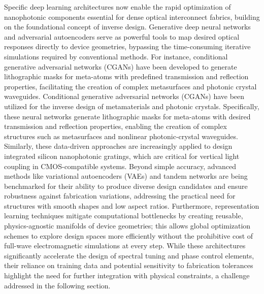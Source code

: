 \documentclass[11pt]{article}
\begin{document}
Specific deep learning architectures now enable the rapid optimization of nanophotonic components essential for dense optical interconnect fabrics, building on the foundational concept of inverse design. Generative deep neural networks and adversarial autoencoders serve as powerful tools to map desired optical responses directly to device geometries, bypassing the time-consuming iterative simulations required by conventional methods. For instance, conditional generative adversarial networks (CGANs) have been developed to generate lithographic masks for meta-atoms with predefined transmission and reflection properties, facilitating the creation of complex metasurfaces and photonic crystal waveguides. Conditional generative adversarial networks (CGANs) have been utilized for the inverse design of metamaterials and photonic crystals. Specifically, these neural networks generate lithographic masks for meta-atoms with desired transmission and reflection properties, enabling the creation of complex structures such as metasurfaces and nonlinear photonic-crystal waveguides. \citep{doi_10_1109_metamaterials62190_2024_10703328_b89eaef7} Similarly, these data-driven approaches are increasingly applied to design integrated silicon nanophotonic gratings, which are critical for vertical light coupling in CMOS-compatible systems. Beyond simple accuracy, advanced methods like variational autoencoders (VAEs) and tandem networks are being benchmarked for their ability to produce diverse design candidates and ensure robustness against fabrication variations, addressing the practical need for structures with smooth shapes and low aspect ratios. Furthermore, representation learning techniques mitigate computational bottlenecks by creating reusable, physics-agnostic manifolds of device geometries; this allows global optimization schemes to explore design spaces more efficiently without the prohibitive cost of full-wave electromagnetic simulations at every step. While these architectures significantly accelerate the design of spectral tuning and phase control elements, their reliance on training data and potential sensitivity to fabrication tolerances highlight the need for further integration with physical constraints, a challenge addressed in the following section. \citep{doi_10_1109_metamaterials62190_2024_10703328_b89eaef7} \citep{doi_10_1109_cleo_europe_eqec52157_2021_9542763_c5b6331c} \citep{doi_10_29026_oes_2022_210012_27973a69} \citep{doi_10_1002_adom_202502062_d73a85e1}
\end{document}
